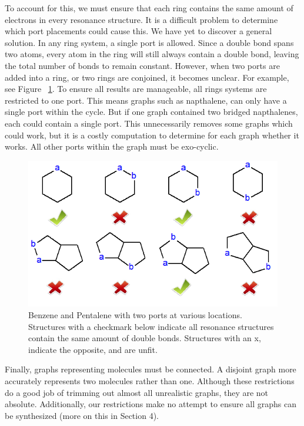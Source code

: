 \documentclass[12pt]{article}
\begin{document}
To account for this, we must ensure that each ring contains the same amount of electrons in every resonance structure. It is a difficult problem to determine which port placements could cause this. We have yet to discover a general solution. In any ring system, a single port is allowed. Since a double bond spans two atoms, every atom in the ring will still always contain a double bond, leaving the total number of bonds to remain constant. However, when two ports are added into a ring, or two rings are conjoined, it becomes unclear. For example, see Figure ~\ref{fig:checkMarks}. To ensure all results are manageable, all rings systems are restricted to one port. This means graphs such as napthalene, can only have a single port within the cycle. But if one graph contained two bridged napthalenes, each could contain a single port. This unnecessarily removes some graphs which could work, but it is a costly computation to determine for each graph whether it works. All other ports within the graph must be exo-cyclic. 

\begin{figure}[ht!]
\centering
\includegraphics[width=130mm]{checkMarks.png}
\caption{Benzene and Pentalene with two ports at various locations. Structures with a checkmark below indicate all resonance structures contain the same amount of double bonds. Structures with an x, indicate the opposite, and are unfit.}
\label{fig:checkMarks}
\end{figure}

Finally, graphs representing molecules must be connected. A disjoint graph more accurately represents two molecules rather than one. Although these restrictions do a good job of trimming out almost all unrealistic graphs, they are not absolute. Additionally, our restrictions make no attempt to ensure all graphs can be synthesized (more on this in Section 4). 
\end{document}
